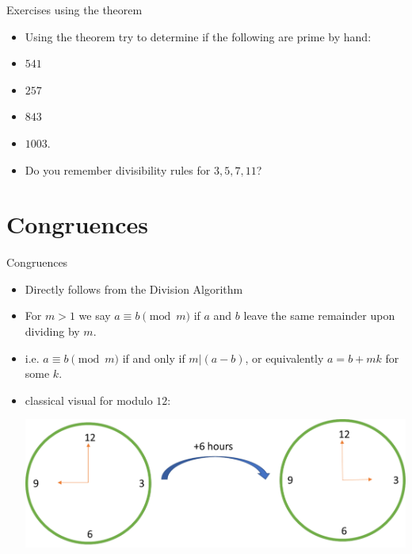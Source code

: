 \documentclass[ %
 usenames,dvipsnames,
aspectratio=169,11pt ]{beamer}
\newenvironment{stepitemize}{\begin{itemize}[<+->]}{\end{itemize} }
\begin{document}
\begin{frame}{Exercises using the theorem}
\begin{stepitemize}
\item Using the theorem try to determine if the following are prime by hand:
\item $541$
\item $257$
\item $843$
\item $1003$.
\item Do you remember divisibility rules for $3,5,7,11$?
\end{stepitemize}

\end{frame}

\section{Congruences}
\begin{frame}{Congruences}
\begin{stepitemize}
\item Directly follows from the Division Algorithm
\item For $m>1$ we say $a\equiv b \pmod{m}$ if $a$ and $b$ leave the same remainder upon dividing by $m$.
\item i.e. $a\equiv b \pmod{m}$ if and only if $m|(a-b)$, or equivalently $a=b+mk$ for some $k$.
\item classical visual for modulo $12$:
    \begin{center}
    \includegraphics[scale=.35]{clock.pdf}
\end{center}

\end{stepitemize}
\end{frame}
\end{document}
